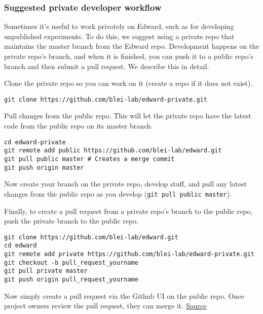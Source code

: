 \subsubsection{Suggested private developer workflow}
\label{suggested-private-workflow}

Sometimes it's useful to work privately on Edward, such as for
developing unpublished experiments.
To do this, we suggest using a private repo
that maintains the master branch from the Edward repo. Development
happens on the private repo's branch, and when it is finished, you can
push it to a public repo's branch and then submit a pull request. We
describe this in detail.

Clone the private repo so you can work on it (create a repo if it does
not exist).

\begin{lstlisting}[class=JSON]
git clone https://github.com/blei-lab/edward-private.git
\end{lstlisting}

Pull changes from the public repo. This will let the private repo have
the latest code from the public repo on its master branch.

\begin{lstlisting}[class=JSON]
cd edward-private
git remote add public https://github.com/blei-lab/edward.git
git pull public master # Creates a merge commit
git push origin master
\end{lstlisting}

Now create your branch on the private repo, develop stuff, and pull any
latest changes from the public repo as you develop
(\texttt{git\ pull\ public\ master}).

Finally, to create a pull request from a private repo's branch to the
public repo, push the private branch to the public repo.

\begin{lstlisting}[class=JSON]
git clone https://github.com/blei-lab/edward.git
cd edward
git remote add private https://github.com/blei-lab/edward-private.git
git checkout -b pull_request_yourname
git pull private master
git push origin pull_request_yourname
\end{lstlisting}

Now simply create a pull request via the Github UI on the public repo.
Once project owners review the pull request, they can merge it.
\href{http://stackoverflow.com/questions/10065526/github-how-to-make-a-fork-of-public-repository-private/30352360\#30352360}{Source}

